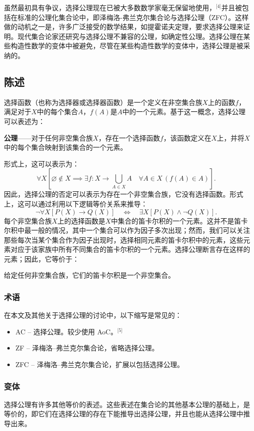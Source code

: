 虽然最初具有争议，选择公理现在已被大多数数学家毫无保留地使用，\(^\text{[4]}\)并且被包括在标准的公理化集合论中，即泽梅洛-弗兰克尔集合论与选择公理（ZFC）。这样做的动机之一是，许多广泛接受的数学结果，如提霍诺夫定理，要求选择公理来证明。现代集合论家还研究与选择公理不兼容的公理，如确定性公理。选择公理在某些构造性数学的变体中被避免，尽管在某些构造性数学的变体中，选择公理是被采纳的。
\subsection{陈述}  
选择函数（也称为选择器或选择器函数）是一个定义在非空集合族\(X\)上的函数\(f\)，满足对于\(X\)中的每个集合\(A\)，\(f(A)\)是\(A\)中的一个元素。基于这一概念，选择公理可以表述为：

\textbf{公理}——对于任何非空集合族\(X\)，存在一个选择函数\(f\)，该函数定义在\(X\)上，并将\(X\)中的每个集合映射到该集合的一个元素。

形式上，这可以表示为：
\[
\forall X\left[\varnothing \notin X \implies \exists f\colon X \rightarrow \bigcup_{A \in X} A \quad \forall A \in X\,(f(A) \in A)\right].~
\]
因此，选择公理的否定可以表示为存在一个非空集合族，它没有选择函数。形式上，这可以通过利用以下逻辑等价关系来推导：
\[
\neg \forall X\left[P(X) \to Q(X)\right] \quad \iff \quad \exists X\left[P(X) \land \neg Q(X)\right].~
\]
每个非空集合族\(X\)上的选择函数是\(X\)中集合的笛卡尔积的一个元素。这并不是笛卡尔积中最一般的情况，其中一个集合可以作为因子多次出现；然而，我们可以关注那些每次当某个集合作为因子出现时，选择相同元素的笛卡尔积中的元素，这些元素对应于该家族中所有不同集合的笛卡尔积的一个元素。选择公理断言存在这样的元素；因此，它等价于：

给定任何非空集合族，它们的笛卡尔积是一个非空集合。
\subsubsection{术语}  
在本文及其他关于选择公理的讨论中，以下缩写是常见的：
\begin{itemize}
\item AC – 选择公理。较少使用 AoC。\(^\text{[5]}\)  
\item ZF – 泽梅洛–弗兰克尔集合论，省略选择公理。  
\item ZFC – 泽梅洛–弗兰克尔集合论，扩展以包括选择公理。
\end{itemize}
\subsubsection{变体}  
选择公理有许多其他等价的表述。这些表述在集合论的其他基本公理的基础上，是等价的，即它们在选择公理的存在下能推导出选择公理，并且也能从选择公理中推导出来。

